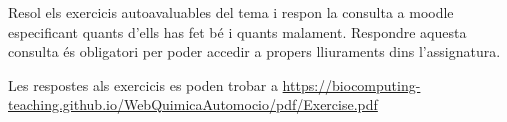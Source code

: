 \documentclass{report}
\let\oldurl\url
\let\url\oldurl
\begin{document}
Resol els exercicis autoavaluables del tema i respon la consulta a moodle especificant quants d'ells has fet bé i quants malament. Respondre aquesta consulta és obligatori per poder accedir a propers lliuraments dins l'assignatura.

Les respostes als exercicis es poden trobar a \url{https://biocomputing-teaching.github.io/WebQuimicaAutomocio/pdf/Exercise.pdf}



\printbibliography
\end{document}
